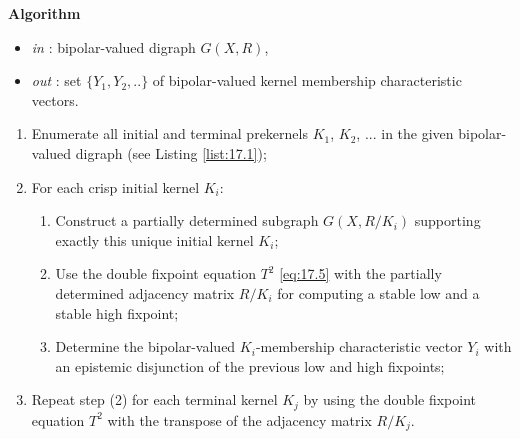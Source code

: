 \noindent \textbf{Algorithm} 
\begin{itemize}
 \item [] \emph{in} : bipolar-valued digraph $G(X,R)$,
 \item [] \emph{out} : set $\{Y_1, Y_2, .. \}$ of bipolar-valued kernel membership characteristic vectors.
\end{itemize}
\begin{enumerate}
\item Enumerate all initial and terminal prekernels $K_1$, $K_2$, ... in the given bipolar-valued digraph (see Listing \ref{list:17.1});
\item For each crisp initial kernel $K_i$:
  \begin{enumerate}
  \item Construct a partially determined subgraph $G(X,R/K_i)$ supporting exactly this unique initial kernel $K_i$;
  \item Use the double fixpoint equation $T^2$ \ref{eq:17.5} with the partially determined adjacency matrix $R/K_i$ for computing a stable low and a stable high fixpoint;
   \item Determine the bipolar-valued $K_i$-membership characteristic vector $Y_i$ with an epistemic disjunction of the previous low and high fixpoints;
  \end{enumerate}
\item Repeat step (2) for each terminal kernel $K_j$ by using the double fixpoint equation $T^2$ with the transpose of the adjacency matrix $R/K_j$.
\end{enumerate}

